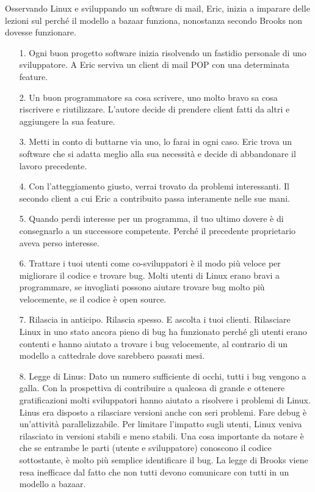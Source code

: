 \documentclass[a4paper,12pt,titlepage,oneside]{book}
\begin{document}
Osservando Linux e sviluppando un software di mail, Eric, inizia a imparare delle lezioni sul perché il modello a bazaar funziona, nonostanza secondo Brooks non dovesse funzionare.
\begin{itemize}
    \item[1.] Ogni buon progetto software inizia risolvendo un fastidio personale di uno sviluppatore.
    A Eric serviva un client di mail POP con una determinata feature.

    \item[2.] Un buon programmatore sa cosa scrivere, uno molto bravo sa cosa riscrivere e riutilizzare.
    L'autore decide di prendere client fatti da altri e aggiungere la sua feature.

    \item[3.] Metti in conto di buttarne via uno, lo farai in ogni caso.
    Eric trova un software che si adatta meglio alla sua necessità e decide di abbandonare il lavoro precedente.

    \item[4.] Con l'atteggiamento giusto, verrai trovato da problemi interessanti.
    Il secondo client a cui Eric a contribuito passa interamente nelle sue mani.

    \item[5.] Quando perdi interesse per un programma, il tuo ultimo dovere è di consegnarlo a un successore competente.
    Perché il precedente proprietario aveva perso interesse.

    \item[6.] Trattare i tuoi utenti come co-sviluppatori è il modo più veloce per migliorare il codice e trovare bug.
    Molti utenti di Linux erano bravi a programmare, se invogliati possono aiutare trovare bug molto più velocemente, se il codice è open source. 

    \item[7.] Rilascia in anticipo. Rilascia spesso. E ascolta i tuoi clienti.
    Rilasciare Linux in uno stato ancora pieno di bug ha funzionato perché gli utenti erano contenti e hanno aiutato a trovare i bug velocemente, al contrario di un modello a cattedrale dove sarebbero passati mesi.

    \item[8.] Legge di Linus: Dato un numero sufficiente di occhi, tutti i bug vengono a galla.
    Con la prospettiva di contribuire a qualcosa di grande e ottenere gratificazioni molti sviluppatori hanno aiutato a risolvere i problemi di Linux. Linus era disposto a rilasciare versioni anche con seri problemi.
    Fare debug è un'attività parallelizzabile.
    Per limitare l'impatto sugli utenti, Linux veniva rilasciato in versioni stabili e meno stabili.
    Una cosa importante da notare è che se entrambe le parti (utente e sviluppatore) conoscono il codice sottostante, è molto più semplice identificare il bug.
    La legge di Brooks viene resa inefficace dal fatto che non tutti devono comunicare con tutti in un modello a bazaar.


\end{itemize}
\end{document}
